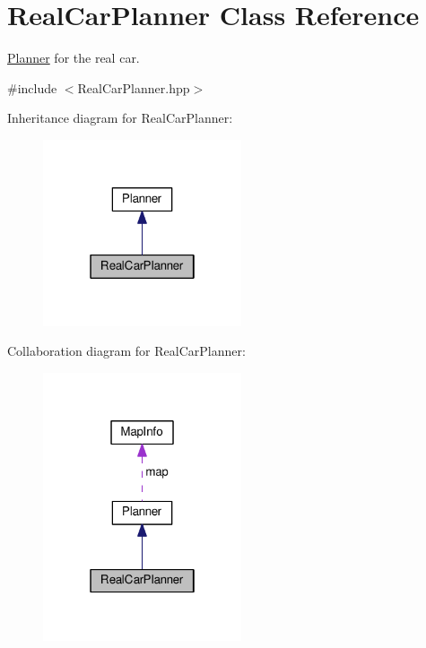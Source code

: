 \hypertarget{classRealCarPlanner}{}\section{Real\+Car\+Planner Class Reference}
\label{classRealCarPlanner}


\hyperlink{classPlanner}{Planner} for the real car.  




{\ttfamily \#include $<$Real\+Car\+Planner.\+hpp$>$}



Inheritance diagram for Real\+Car\+Planner\+:\nopagebreak
\begin{figure}[H]
\begin{center}
\leavevmode
\includegraphics[width=166pt]{classRealCarPlanner__inherit__graph}
\end{center}
\end{figure}


Collaboration diagram for Real\+Car\+Planner\+:\nopagebreak
\begin{figure}[H]
\begin{center}
\leavevmode
\includegraphics[width=166pt]{classRealCarPlanner__coll__graph}
\end{center}
\end{figure}
